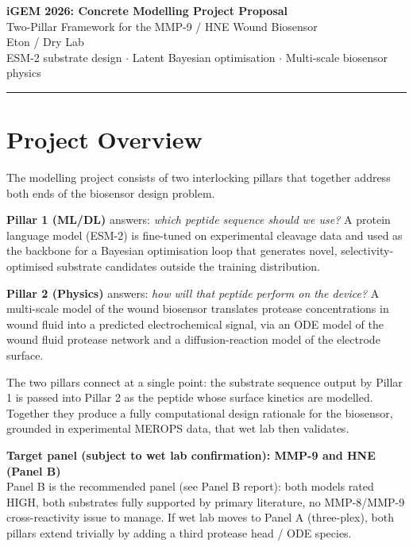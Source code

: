 \documentclass[10pt,a4paper]{article}
\newcommand{\pillar}[1]{\textcolor[rgb]{0.12,0.30,0.58}{\textbf{#1}}}
\begin{document}
\begin{center}
  {\LARGE\bfseries iGEM 2026: Concrete Modelling Project Proposal}\\[4pt]
  {\large Two-Pillar Framework for the MMP-9 / HNE Wound Biosensor}\\[3pt]
  {\small\color{gray} Eton / Dry Lab}\\[1pt]
  {\small\color{gray}
    ESM-2 substrate design $\cdot$ Latent Bayesian optimisation $\cdot$
    Multi-scale biosensor physics}
\end{center}

\vspace{0.5em}\hrule\vspace{0.8em}

\section{Project Overview}

The modelling project consists of two interlocking pillars that together
address both ends of the biosensor design problem.

\pillar{Pillar 1 (ML/DL)} answers: \emph{which peptide sequence should we use?}
A protein language model (ESM-2) is fine-tuned on experimental cleavage data
and used as the backbone for a Bayesian optimisation loop that generates novel,
selectivity-optimised substrate candidates outside the training distribution.

\pillar{Pillar 2 (Physics)} answers: \emph{how will that peptide perform on the
device?}
A multi-scale model of the wound biosensor translates protease concentrations in
wound fluid into a predicted electrochemical signal, via an ODE model of the wound
fluid protease network and a diffusion-reaction model of the electrode surface.

The two pillars connect at a single point: the substrate sequence output by Pillar 1
is passed into Pillar 2 as the peptide whose surface kinetics are modelled.
Together they produce a fully computational design rationale for the biosensor,
grounded in experimental MEROPS data, that wet lab then validates.

\medskip
\begin{tcolorbox}[colback=boxblue,colframe=blue!40,boxrule=0.5pt]
\textbf{Target panel (subject to wet lab confirmation): MMP-9 and HNE (Panel B)}\\[4pt]
\small
Panel B is the recommended panel (see Panel B report): both models rated HIGH,
both substrates fully supported by primary literature, no MMP-8/MMP-9
cross-reactivity issue to manage.  If wet lab moves to Panel A (three-plex),
both pillars extend trivially by adding a third protease head / ODE species.
\end{tcolorbox}
\end{document}
